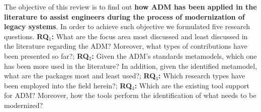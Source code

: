 

The objective of this review is to find out \textbf{how ADM has been applied in the literature to assist engineers during the process of modernization of legacy systems}. In order to achieve such objective we formulated five research questions. \textbf{RQ$_1$:} What are the focus area most discussed and least discussed in the literature regarding the ADM? Moreover, what types of contributions have been presented so far?; \textbf{RQ$_2$:} Given the ADM's standards metamodels, which one has been more used in the literature? In addition, given the identified metamodel, what are the packages most and least used?; \textbf{RQ$_3$:} Which research types have been employed into the field herein?; \textbf{RQ$_4$:} Which are the existing tool support for ADM? Moreover, how the tools perform the identification of what needs to be modernized?











